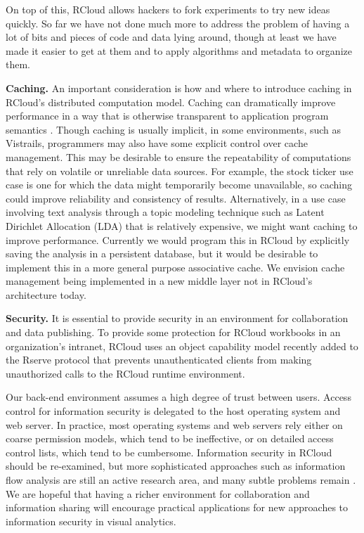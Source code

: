 On top of this, RCloud allows hackers to fork experiments to try
new ideas quickly. So far we have not done much more to address the
problem of having a lot of bits and pieces of code and data lying
around, though at least we have made it easier to get at them and
to apply algorithms and metadata to organize them.


{\bf Caching.}
An important consideration is how and where to introduce caching
in RCloud's distributed computation model. Caching can dramatically
improve performance in a way that is otherwise transparent to
application program semantics \cite{Callahan:2006:VVM, Guo:2010:TPI}.
Though caching is usually implicit, in some environments, such as
Vistrails, programmers may also have some explicit control over cache
management. This may be desirable to ensure the repeatability of
computations that rely on volatile or unreliable data sources.
For example, the stock ticker use case is one for which the data
might temporarily become unavailable, so caching could improve
reliability and consistency of results.  Alternatively, in a use case
involving text analysis through a topic modeling technique such as
Latent Dirichlet Allocation (LDA) that is relatively expensive,
we might want caching to improve performance. Currently we would
program this in RCloud by explicitly saving the analysis in a
persistent database, but it would be desirable to implement this
in a more general purpose associative cache. We envision cache
management being implemented in a new middle layer not in RCloud's
architecture today.

{\bf Security.}
It is essential to provide security in an environment for
collaboration and data publishing. To provide some
protection for RCloud workbooks in an organization's intranet,
RCloud uses an object capability model
\cite{Miller:2006:RCT}
recently added to the Rserve protocol \cite{Urbanek:2003:AFW}
that prevents unauthenticated clients from making
unauthorized calls to the RCloud runtime environment.

Our back-end environment assumes a high degree of trust between users.
Access control for information security is delegated to the host
operating system and web server. In practice, most operating
systems and web servers rely either on coarse permission models,
which tend to be ineffective, or on detailed access control
lists, which tend to be cumbersome. 
Information security in RCloud should be re-examined, but more
sophisticated approaches such as information flow analysis are
still an active research area, and many subtle problems remain
\cite{Moore:2011:SAF}. We are hopeful that having a richer
environment for collaboration and information sharing will encourage
practical applications for new approaches to information security
in visual analytics.
